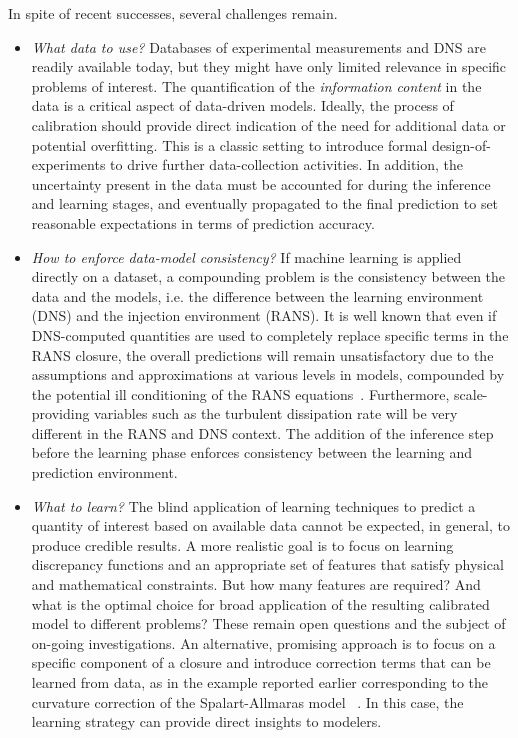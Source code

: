 \documentclass[a4paper]{ar-1col}
\begin{document}
 In spite of recent successes, several challenges  remain.

\begin{itemize}
\item {\it What data to use?} Databases of experimental measurements and DNS are readily available today, but they might have only limited relevance in specific problems of interest. The quantification of
the {\it information content} in the data is a critical aspect of data-driven models. Ideally, the process of calibration should provide direct indication of the need for additional data or potential overfitting. This is a classic setting to introduce formal design-of-experiments to  drive further data-collection activities.
In addition, the uncertainty present in the data must be accounted for during the inference and learning stages, and eventually propagated to the final prediction to set reasonable expectations in terms of prediction accuracy.
\item {\it How to enforce data-model consistency?} If machine learning is applied directly on a dataset, a compounding problem is the consistency between the data and the models, i.e. the
difference between the learning environment (DNS) and the injection environment (RANS).  It is well known that even if DNS-computed quantities are used to completely replace specific terms in the RANS closure, the overall predictions will remain unsatisfactory \citep{thompson2016methodology, poroseva2016on} due to  the assumptions and approximations at various levels in models, compounded by the potential ill conditioning of the RANS equations~\citep{wu2018on}. Furthermore, scale-providing variables such as the turbulent dissipation rate will be very different in the RANS and DNS context. The addition of the inference step before the learning phase  enforces consistency between the learning and prediction environment.
\item {\it What to learn?} The blind application of learning techniques to predict a quantity of interest based on available data cannot be expected, in general, to produce credible results. A more realistic goal is to focus on learning discrepancy functions and  an appropriate set of features that satisfy physical and mathematical constraints. But how many features are required? And what is the optimal choice for broad application of the resulting calibrated model to different problems? These remain open questions and the subject of on-going investigations.
An alternative, promising approach  is to focus on a specific component  of a closure and introduce correction terms that can be learned from data, as in the example reported earlier corresponding to the curvature correction of the Spalart-Allmaras model ~\citep{singh2016using}. In this case, the learning strategy can provide direct insights to modelers.

\end{itemize}
\end{document}
